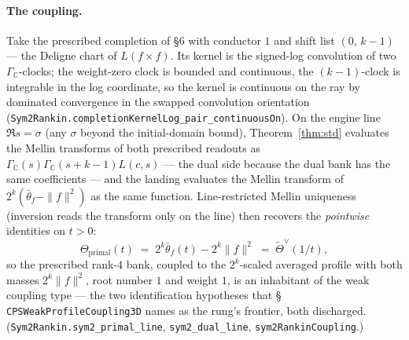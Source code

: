 \documentclass[11pt]{article}
\newcommand{\Gm}{\Gamma_{\mathbb C}}
\begin{document}
\paragraph{The coupling.}  Take the prescribed completion of \S6 with conductor $1$ and shift
list $(0,\,k-1)$ --- the Deligne chart of $L(f\times f)$.  Its kernel is the signed-log
convolution of two $\Gamma_{\mathbb C}$-clocks; the weight-zero clock is bounded and continuous,
the $(k-1)$-clock is integrable in the log coordinate, so the kernel is continuous on the ray by
dominated convergence in the swapped convolution orientation
(\texttt{Sym2Rankin.completionKernelLog\_pair\_continuousOn}).  On the engine line
$\Re s=\sigma$ (any $\sigma$ beyond the initial-domain bound), Theorem~\ref{thm:std} evaluates
the Mellin transforms of both prescribed readouts as
$\Gm(s)\Gm(s+k-1)L(c,s)$ --- the dual side because the dual bank has the same coefficients ---
and the landing evaluates the Mellin transform of $2^{k}(\bar\theta_f-\|f\|^2)$ as the same
function.  Line-restricted Mellin uniqueness (inversion reads the transform only on the line)
then recovers the \emph{pointwise} identities on $t>0$:
\[
  \Theta_{\mathrm{primal}}(t)\;=\;2^{k}\bar\theta_f(t)-2^{k}\|f\|^2
  \;=\;\widetilde\Theta^{\vee}(1/t),
\]
so the prescribed rank-4 bank, coupled to the $2^{k}$-scaled averaged profile with both masses
$2^{k}\|f\|^2$, root number $1$ and weight $1$, is an inhabitant of the weak coupling type ---
the two identification hypotheses that \S\,\texttt{CPSWeakProfileCoupling3D} names as the
rung's frontier, both discharged.  (\texttt{Sym2Rankin.sym2\_primal\_line},
\texttt{sym2\_dual\_line}, \texttt{sym2RankinCoupling}.)
\end{document}
